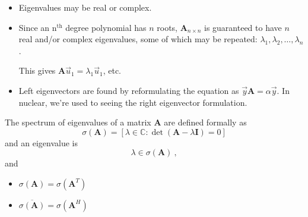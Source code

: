 \documentclass[12pt]{article}
\newcommand{\nth}{n\ensuremath{^{\text{th}}} }
\newcommand{\ve}[1]{\ensuremath{\mathbf{#1}}}
\newcommand{\cc}[1]{\ensuremath{\overline{#1}}}
\begin{document}
\begin{itemize}
\item Eigenvalues may be real or complex. 

\item Since an \nth degree polynomial has $n$ roots, $\ve{A}_{n \times n}$ is guaranteed to have $n$ real and/or complex eigenvalues, some of which may be repeated: $\lambda_1, \lambda_2, \dots, \lambda_n$.

This gives $\ve{A}\vec{u}_1 = \lambda_1 \vec{u}_1$, etc.

\item Left eigenvectors are found by reformulating the equation as $\vec{y}\ve{A} = \alpha \vec{y}$. In nuclear, we're used to seeing the right eigenvector formulation.
\end{itemize}


The spectrum of eigenvalues of a matrix $\ve{A}$ are defined formally as
\[\sigma(\ve{A}) = [ \lambda \in \mathbb{C} : \det(\ve{A} - \lambda \ve{I})=0] \] 
and an eigenvalue is 
\[ \lambda \in \sigma(\ve{A})\:,\]
and
\begin{itemize}
\item $\sigma(\ve{A}) = \sigma(\ve{A}^T)$
\item $\cc{\sigma(\ve{A})} = \sigma(\ve{A}^H)$
\end{itemize}
\end{document}
